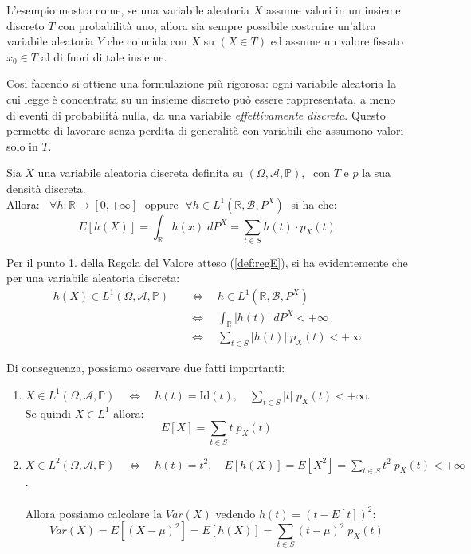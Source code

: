 L'esempio mostra come, se una variabile aleatoria $X$ assume valori in un insieme discreto $T$ con probabilità uno, allora sia sempre possibile costruire un'altra variabile aleatoria $Y$ che coincida con $X$ su $(X \in T)$ ed assume un valore fissato $x_0 \in T$ al di fuori di tale insieme.

\medskip
Cosi facendo si ottiene una formulazione più rigorosa: ogni variabile aleatoria la cui legge è concentrata su un insieme discreto può essere rappresentata, a meno di eventi di probabilità nulla, da una variabile \emph{effettivamente discreta}. Questo permette di lavorare senza perdita di generalità con variabili che assumono valori solo in $T$.

\bigskip
\begin{proposizione}
    Sia $X$ una variabile aleatoria discreta definita su $(\Omega, \mathcal{A}, \mathbb{P}), \;$ con $T$ e $p$ la sua densità discreta. \\
    Allora: \(\;\;\forall h:\mathbb{R}\to [0, +\infty]\;\text{ oppure }\; \forall h\in L^1\left(\mathbb{R}, \mathcal{B}, P^X\right)\;\) si ha che:
    \[\boxed{E[h(X)] = \int_\mathbb{R}h(x)\; dP^X = \sum_{t\in S} h(t)\cdot p_X(t)}\]
\end{proposizione}

Per il punto 1. della Regola del Valore atteso (\ref{def:regE}), si ha evidentemente che per una variabile aleatoria discreta:
\begin{align*}
    h(X)\in L^1(\Omega, \mathcal{A}, \mathbb{P}) \quad & \iff \quad h\in L^1(\mathbb{R}, \mathcal{B}, P^X)\\
    & \iff \quad \int_\mathbb{R} \left|h(t)\right|\;dP^X <+\infty\\
    & \iff \quad \sum_{t\in S} \left|h(t)\right|\;p_X(t) <+\infty
\end{align*}

Di conseguenza, possiamo osservare due fatti importanti:
\begin{enumerate}
    \item $X\in L^1 (\Omega, \mathcal{A}, \mathbb{P})\quad \iff \quad h(t) = \text{Id}(t), \quad \sum_{t\in S} \left|t\right|\;p_X(t) <+\infty$.\\
    Se quindi $X\in L^1$ allora: 
    \[\boxed {E[X] = \underset{t\in S}{\sum} t\;p_X(t)}\]
    \item $X\in L^2 (\Omega, \mathcal{A}, \mathbb{P})\quad \iff \quad h(t) = t^2, \quad E[h(X)] = E[X^2] = \sum_{t\in S} t^2\;p_X(t) <+\infty$.\\
    \\
    Allora possiamo calcolare la $Var(X)$ vedendo $h(t) = (t-E[t])^2$:
    \[\boxed{Var(X) = E\left[(X-\mu)^2\right] = E[h(X)] = \sum_{t\in S} (t-\mu)^2\;p_X(t)}\] 
\end{enumerate}

